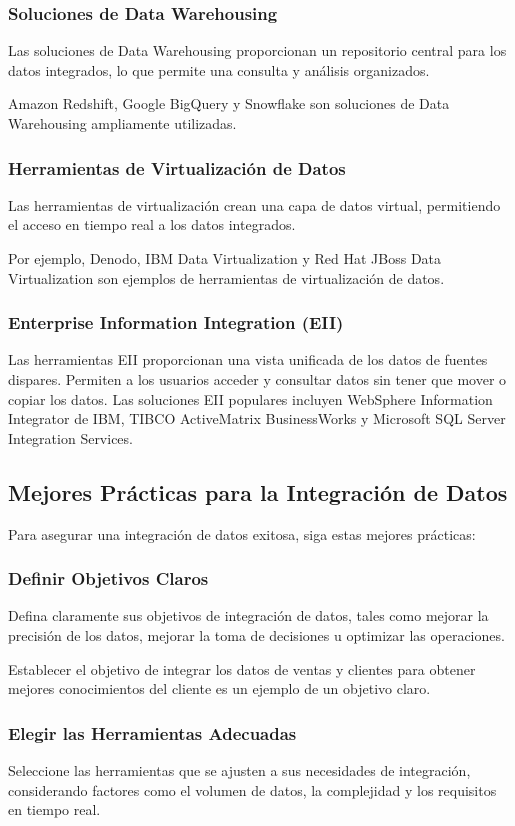 \documentclass[12pt]{book}
\begin{document}
\subsubsection{Soluciones de Data Warehousing}
Las soluciones de Data Warehousing proporcionan un repositorio central para los datos integrados, lo que permite una consulta y análisis organizados.

Amazon Redshift, Google BigQuery y Snowflake son soluciones de Data Warehousing ampliamente utilizadas.

\subsubsection{Herramientas de Virtualización de Datos}
Las herramientas de virtualización crean una capa de datos virtual, permitiendo el acceso en tiempo real a los datos integrados.

Por ejemplo, Denodo, IBM Data Virtualization y Red Hat JBoss Data Virtualization son ejemplos de herramientas de virtualización de datos.

\subsubsection{Enterprise Information Integration (EII)}
Las herramientas EII proporcionan una vista unificada de los datos de fuentes dispares.  Permiten a los usuarios acceder y consultar datos sin tener que mover o copiar los datos.  Las soluciones EII populares incluyen WebSphere Information Integrator de IBM, TIBCO ActiveMatrix BusinessWorks y Microsoft SQL Server Integration Services.
\subsection{Mejores Prácticas para la Integración de Datos}
Para asegurar una integración de datos exitosa, siga estas mejores prácticas:

\subsubsection{Definir Objetivos Claros}
Defina claramente sus objetivos de integración de datos, tales como mejorar la precisión de los datos, mejorar la toma de decisiones u optimizar las operaciones.

Establecer el objetivo de integrar los datos de ventas y clientes para obtener mejores conocimientos del cliente es un ejemplo de un objetivo claro.

\subsubsection{Elegir las Herramientas Adecuadas}
Seleccione las herramientas que se ajusten a sus necesidades de integración, considerando factores como el volumen de datos, la complejidad y los requisitos en tiempo real.
\end{document}
